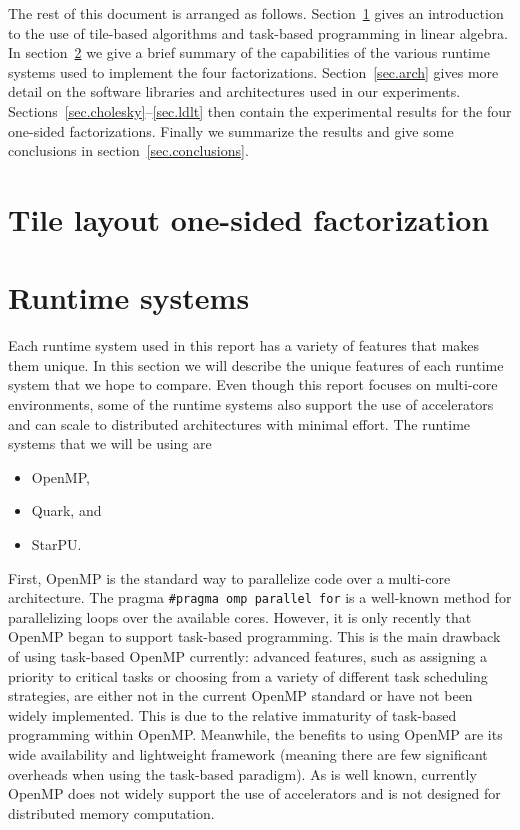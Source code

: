\documentclass[a4paper,12pt]{article}
\begin{document}
The rest of this document is arranged as follows.
Section~\ref{sec.tile} gives an introduction
to the use of tile-based algorithms and
task-based programming in linear algebra.
In section~\ref{sec.runtime_systems} we give a
brief summary of the capabilities of the various
runtime systems used to implement the four factorizations.
Section~\ref{sec.arch} gives more detail on the
software libraries and architectures used in our experiments.
Sections~\ref{sec.cholesky}--\ref{sec.ldlt} then
contain the experimental results for the four
one-sided factorizations.
Finally we summarize the results and give some conclusions
in section~\ref{sec.conclusions}.

\section{Tile layout one-sided factorization}
\label{sec.tile}




\section{Runtime systems}
\label{sec.runtime_systems}
Each runtime system used in this report has a variety of
features that makes them unique.
In this section we will describe the unique features of each runtime
system that we hope to compare.
Even though this report focuses on multi-core environments,
some of the runtime systems also support the use of accelerators
and can scale to distributed architectures with
minimal effort.
The runtime systems that we will be using are
\begin{itemize}
\item OpenMP,
\item Quark, and
\item StarPU.
\end{itemize}

First, OpenMP is the standard way to parallelize code over a
multi-core architecture.  The pragma
\texttt{\#pragma omp parallel for}
is a well-known method for parallelizing loops
over the available cores.
However, it is only recently that OpenMP
began to support task-based programming.  This is the main drawback of
using task-based OpenMP currently: advanced features, such as
assigning a priority to critical tasks or choosing from a variety of
different task scheduling strategies, are either not in the current
OpenMP standard or have not been widely implemented.  This is due to
the relative immaturity of task-based programming within OpenMP.
Meanwhile, the benefits to using OpenMP are its wide availability and
lightweight framework (meaning there are few significant overheads
when using the task-based paradigm).  As is well known, currently
OpenMP does not widely support the use of accelerators and is not
designed for distributed memory computation.
\end{document}
